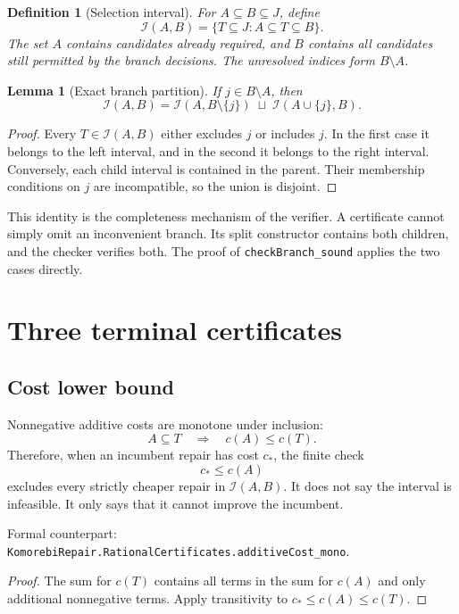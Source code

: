 \documentclass[11pt,letterpaper,oneside,openany]{book}
\theoremstyle{quiet}
\newtheorem{lemma}[theorem]{Lemma}
\newtheorem{definition}[theorem]{Definition}
\newcommand{\decl}[1]{{\small\nolinkurl{#1}}}
\newcommand{\formal}[1]{\par\nobreak\begingroup\footnotesize\color{Slate}\sffamily Formal counterpart: \normalfont\nolinkurl{#1}.\par\endgroup}
\begin{document}
\begin{definition}[Selection interval]
For $A\subseteq B\subseteq J$, define
\[
 \mathcal I(A,B)=\{T\subseteq J:A\subseteq T\subseteq B\}.
\]
The set $A$ contains candidates already required, and $B$ contains all candidates still permitted by the branch decisions. The unresolved indices form $B\setminus A$.
\end{definition}

\begin{lemma}[Exact branch partition]
If $j\in B\setminus A$, then
\[
 \mathcal I(A,B)=
 \mathcal I(A,B\setminus\{j\})\;\sqcup\;
 \mathcal I(A\cup\{j\},B).
\]
\end{lemma}
\begin{proof}
Every $T\in\mathcal I(A,B)$ either excludes $j$ or includes $j$. In the first case it belongs to the left interval, and in the second it belongs to the right interval. Conversely, each child interval is contained in the parent. Their membership conditions on $j$ are incompatible, so the union is disjoint.
\end{proof}

This identity is the completeness mechanism of the verifier. A certificate cannot simply omit an inconvenient branch. Its split constructor contains both children, and the checker verifies both. The proof of \decl{checkBranch_sound} applies the two cases directly.

\section{Three terminal certificates}

\subsection{Cost lower bound}

Nonnegative additive costs are monotone under inclusion:
\[
 A\subseteq T\quad\Longrightarrow\quad c(A)\leq c(T).
\]
Therefore, when an incumbent repair has cost $c_\ast$, the finite check
\[
 c_\ast\leq c(A)
\]
excludes every strictly cheaper repair in $\mathcal I(A,B)$. It does not say the interval is infeasible. It only says that it cannot improve the incumbent.
\formal{KomorebiRepair.RationalCertificates.additiveCost_mono}

\begin{proof}
The sum for $c(T)$ contains all terms in the sum for $c(A)$ and only additional nonnegative terms. Apply transitivity to $c_\ast\leq c(A)\leq c(T)$.
\end{proof}
\end{document}
